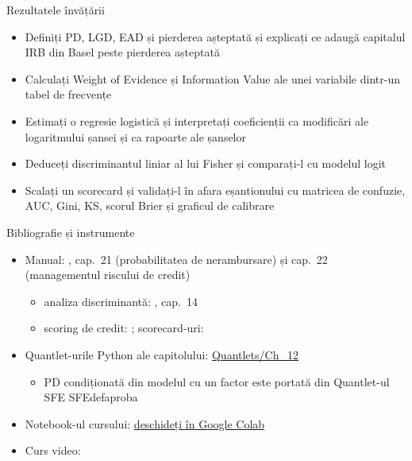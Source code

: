 \begin{frame}{Rezultatele învățării}
\itemsize{\small}
\begin{itemize}
    \item Definiți PD, LGD, EAD și pierderea așteptată și explicați ce adaugă capitalul IRB din Basel peste pierderea așteptată
    \item Calculați Weight of Evidence și Information Value ale unei variabile dintr-un tabel de frecvențe
    \item Estimați o regresie logistică și interpretați coeficienții ca modificări ale logaritmului șansei și ca rapoarte ale șanselor
    \item Deduceți discriminantul liniar al lui Fisher și comparați-l cu modelul logit
    \item Scalați un scorecard și validați-l în afara eșantionului cu matricea de confuzie, AUC, Gini, KS, scorul Brier și graficul de calibrare
\end{itemize}
\end{frame}

\begin{frame}{Bibliografie și instrumente}
\itemsize{\small}
\begin{itemize}
    \item Manual: , cap.~21 (probabilitatea de nerambursare) și cap.~22 (managementul riscului de credit)
    \begin{itemize}
        \item analiza discriminantă: , cap.~14
        \item scoring de credit: ; scorecard-uri: 
    \end{itemize}
    \item Quantlet-urile Python ale capitolului: \href{https://github.com/danpele/SFM/tree/main/Quantlets/Ch_12}{Quantlets/Ch\_12}
    \begin{itemize}
        \item PD condiționată din modelul cu un factor este portată din Quantlet-ul SFE SFEdefaproba
    \end{itemize}
    \item Notebook-ul cursului: \href{\colaburl{notebooks/EN/chapter12_lecture_notebook.ipynb}}{deschideți în Google Colab}
    \item Curs video: 
\end{itemize}
\end{frame}


